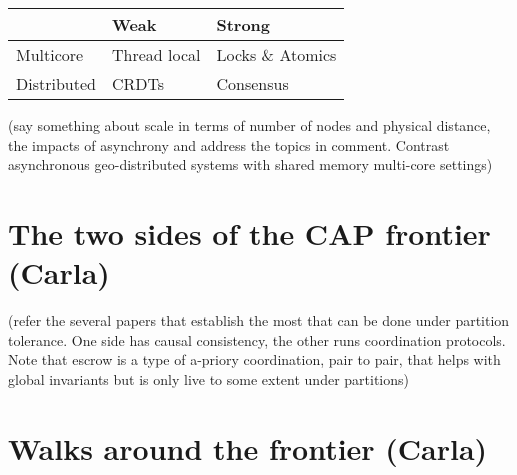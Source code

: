 \documentclass[
graybox,
envcountchap,
]{svmult}
\begin{document}
\begin{bibunit}
\begin{table}
\begin{center}
\begin{tabular}{l|l|l}
  & Weak & Strong\\
  \hline
  Multicore & Thread local & Locks \& Atomics\\
  \hline
  Distributed & CRDTs & Consensus\\
  \hline
\end{tabular}
\end{center}
\end{table}


        (say something about scale in terms of number of nodes and physical distance, the impacts of asynchrony and address the topics in comment. Contrast asynchronous geo-distributed systems with shared memory multi-core settings)

        \section{The two sides of the CAP frontier (Carla)}\label{sec:2}


        (refer the several papers that establish the most that can be done under partition tolerance. One side has causal consistency, the other runs coordination protocols. Note that escrow is a type of a-priory coordination, pair to pair, that helps with global invariants but is only live to some extent under partitions)

        \section{Walks around the frontier (Carla)}\label{sec:2}



\end{bibunit}
\end{document}
